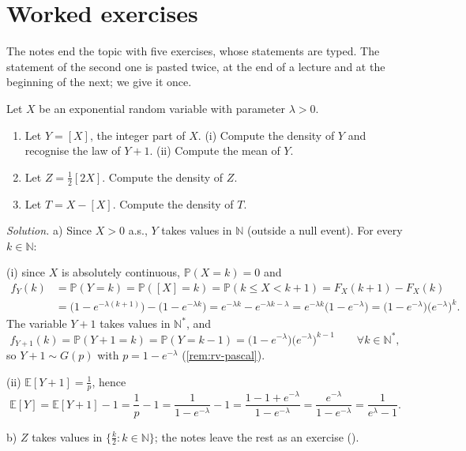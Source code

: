 \section{Worked exercises}\label{sec:rv-worked}

The notes end the topic with five exercises, whose statements are typed. The statement of the
second one is pasted twice, at the end of a lecture and at the beginning of the next; we give it
once.

\begin{example}\label{exa:rv-integer-part}
Let $X$ be an exponential random variable with parameter $\lambda>0$.
\begin{enumerate}[label=\alph*)]
  \item Let $Y=[X]$, the integer part of $X$. (i) Compute the density of $Y$ and recognise the law of
    $Y+1$. (ii) Compute the mean of $Y$.
  \item Let $Z=\frac12[2X]$. Compute the density of $Z$.
  \item Let $T=X-[X]$. Compute the density of $T$.
\end{enumerate}

\emph{Solution.} a) Since $X>0$ a.s., $Y$ takes values in $\mathbb N$ (outside a null event). For
every $k\in\mathbb N$:

(i) since $X$ is absolutely continuous, $\mathbb P(X=k)=0$ and
\[
\begin{aligned}
  f_Y(k)&=\mathbb P(Y=k)=\mathbb P([X]=k)=\mathbb P(k\le X<k+1)=F_X(k+1)-F_X(k)\\
  &=\big(1-e^{-\lambda(k+1)}\big)-\big(1-e^{-\lambda k}\big)=e^{-\lambda k}-e^{-\lambda k-\lambda}
  =e^{-\lambda k}\big(1-e^{-\lambda}\big)=\big(1-e^{-\lambda}\big)\big(e^{-\lambda}\big)^k .
\end{aligned}
\]
The variable $Y+1$ takes values in $\mathbb N^*$, and
\[
  f_{Y+1}(k)=\mathbb P(Y+1=k)=\mathbb P(Y=k-1)=\big(1-e^{-\lambda}\big)\big(e^{-\lambda}\big)^{k-1}
  \qquad\forall k\in\mathbb N^*,
\]
so $Y+1\sim G(p)$ with $p=1-e^{-\lambda}$ (\cref{rem:rv-pascal}).

(ii) $\mathbb E[Y+1]=\frac1p$, hence
\[
  \mathbb E[Y]=\mathbb E[Y+1]-1=\frac1p-1=\frac1{1-e^{-\lambda}}-1=\frac{1-1+e^{-\lambda}}{1-e^{-\lambda}}
  =\frac{e^{-\lambda}}{1-e^{-\lambda}}=\frac1{e^\lambda-1}.
\]

b) $Z$ takes values in $\{\frac k2:k\in\mathbb N\}$; the notes leave the rest as an exercise
().


\end{example}
